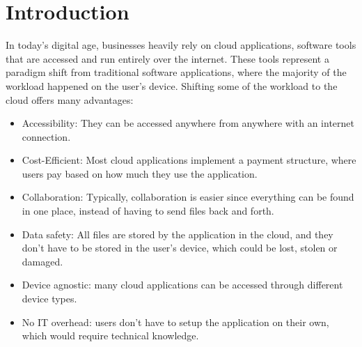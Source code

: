 \chapter{Introduction}
\label{cha:introduction}





In today's digital age, businesses heavily rely on cloud applications, software tools that
are accessed and run entirely over the internet.
These tools represent a paradigm shift from traditional software applications,
where the majority of the workload happened on the user's device.
Shifting some of the workload to the cloud offers many advantages:

\begin{itemize}
    \item Accessibility: They can be accessed anywhere from anywhere with an internet connection.
    \item Cost-Efficient: Most cloud applications implement a payment structure, where
      users pay based on how much they use the application.
    \item Collaboration: Typically, collaboration is easier since everything can be found
      in one place, instead of having to send files back and forth.
    \item Data safety: All files are stored by the application in the cloud, and they don't
      have to be stored in the user's device, which could be lost, stolen or damaged.
    \item Device agnostic: many cloud applications can be accessed through different device types.  
    \item No IT overhead: users don't have to setup the application on their own, which would require technical knowledge.
\end{itemize}

